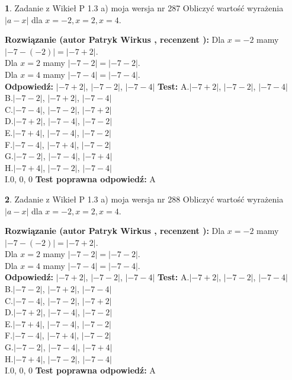 \documentclass[12pt, a4paper]{article}
\theoremstyle{definition} %
\newtheorem{zad}{}
\newcommand{\zadStart}[1]{\begin{zad}#1\newline}
\newcommand{\zadStop}{\end{zad}}
\newcommand{\rozwStart}[2]{\noindent \textbf{Rozwiązanie (autor #1 , recenzent #2): }\newline}
\newcommand{\rozwStop}{\newline}
\newcommand{\odpStart}{\noindent \textbf{Odpowiedź:}\newline}
\newcommand{\odpStop}{\newline}
\newcommand{\testStart}{\noindent \textbf{Test:}\newline}
\newcommand{\testStop}{\newline}
\newcommand{\kluczStart}{\noindent \textbf{Test poprawna odpowiedź:}\newline}
\newcommand{\kluczStop}{\newline}
\begin{document}
\zadStart{Zadanie z Wikieł P 1.3 a) moja wersja nr 287}
Obliczyć wartość wyrażenia $|a - x|$ dla $x=-2,x=2,x=4$.
\zadStop
\rozwStart{Patryk Wirkus}{}
Dla $x = -2$ mamy $|-7 - (-2)| = |-7 + 2|$.\\
Dla $x = 2$ mamy $|-7 - 2| = |-7 - 2|$.\\
Dla $x = 4$ mamy $|-7 - 4| = |-7 - 4|$.\\
\rozwStop
\odpStart
$|-7 + 2|$, $|-7 - 2|$, $|-7 - 4|$
\odpStop
\testStart
A.$|-7 + 2|$, $|-7 - 2|$, $|-7 - 4|$\\
B.$|-7 - 2|$, $|-7 + 2|$, $|-7 - 4|$\\
C.$|-7 - 4|$, $|-7 - 2|$, $|-7 + 2|$\\
D.$|-7 + 2|$, $|-7 - 4|$, $|-7 - 2|$\\
E.$|-7 + 4|$, $|-7 - 4|$, $|-7 - 2|$\\
F.$|-7 - 4|$, $|-7 + 4|$, $|-7 - 2|$\\
G.$|-7 - 2|$, $|-7 - 4|$, $|-7 + 4|$\\
H.$|-7 + 4|$, $|-7 - 2|$, $|-7 - 4|$\\
I.$0$, $0$, $0$
\testStop
\kluczStart
A
\kluczStop



\zadStart{Zadanie z Wikieł P 1.3 a) moja wersja nr 288}
Obliczyć wartość wyrażenia $|a - x|$ dla $x=-2,x=2,x=4$.
\zadStop
\rozwStart{Patryk Wirkus}{}
Dla $x = -2$ mamy $|-7 - (-2)| = |-7 + 2|$.\\
Dla $x = 2$ mamy $|-7 - 2| = |-7 - 2|$.\\
Dla $x = 4$ mamy $|-7 - 4| = |-7 - 4|$.\\
\rozwStop
\odpStart
$|-7 + 2|$, $|-7 - 2|$, $|-7 - 4|$
\odpStop
\testStart
A.$|-7 + 2|$, $|-7 - 2|$, $|-7 - 4|$\\
B.$|-7 - 2|$, $|-7 + 2|$, $|-7 - 4|$\\
C.$|-7 - 4|$, $|-7 - 2|$, $|-7 + 2|$\\
D.$|-7 + 2|$, $|-7 - 4|$, $|-7 - 2|$\\
E.$|-7 + 4|$, $|-7 - 4|$, $|-7 - 2|$\\
F.$|-7 - 4|$, $|-7 + 4|$, $|-7 - 2|$\\
G.$|-7 - 2|$, $|-7 - 4|$, $|-7 + 4|$\\
H.$|-7 + 4|$, $|-7 - 2|$, $|-7 - 4|$\\
I.$0$, $0$, $0$
\testStop
\kluczStart
A
\kluczStop
\end{document}
